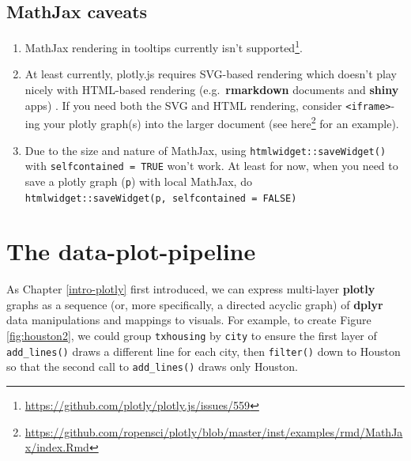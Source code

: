 \documentclass[
  12pt,
]{krantz}
\renewcommand{\href}[2]{#2\footnote{\url{#1}}}
\begin{document}
\hypertarget{mathjax-caveats}{%
\section{MathJax caveats}\label{mathjax-caveats}}

\begin{enumerate}
\def\labelenumi{\arabic{enumi}.}
\item
  MathJax rendering in tooltips \href{https://github.com/plotly/plotly.js/issues/559}{currently isn't supported}.
\item
  At least currently, plotly.js requires SVG-based rendering which doesn't play nicely with HTML-based rendering (e.g.~\textbf{rmarkdown} documents and \textbf{shiny} apps) . If you need both the SVG and HTML rendering, consider \texttt{\textless{}iframe\textgreater{}}-ing your plotly graph(s) into the larger document (see \href{https://github.com/ropensci/plotly/blob/master/inst/examples/rmd/MathJax/index.Rmd}{here} for an example).
\item
  Due to the size and nature of MathJax, using \texttt{htmlwidget::saveWidget()} with \texttt{selfcontained\ =\ TRUE} won't work. At least for now, when you need to save a plotly graph (\texttt{p}) with local MathJax, do \texttt{htmlwidget::saveWidget(p,\ selfcontained\ =\ FALSE)}
\end{enumerate}

\hypertarget{the-data-plot-pipeline}{%
\chapter{The data-plot-pipeline}\label{the-data-plot-pipeline}}

As Chapter \ref{intro-plotly} first introduced, we can express multi-layer \textbf{plotly} graphs as a sequence (or, more specifically, a directed acyclic graph) of \textbf{dplyr} data manipulations and mappings to visuals. For example, to create Figure \ref{fig:houston2}, we could group \texttt{txhousing} by \texttt{city} to ensure the first layer of \texttt{add\_lines()} draws a different line for each city, then \texttt{filter()} down to Houston so that the second call to \texttt{add\_lines()} draws only Houston.
\end{document}
